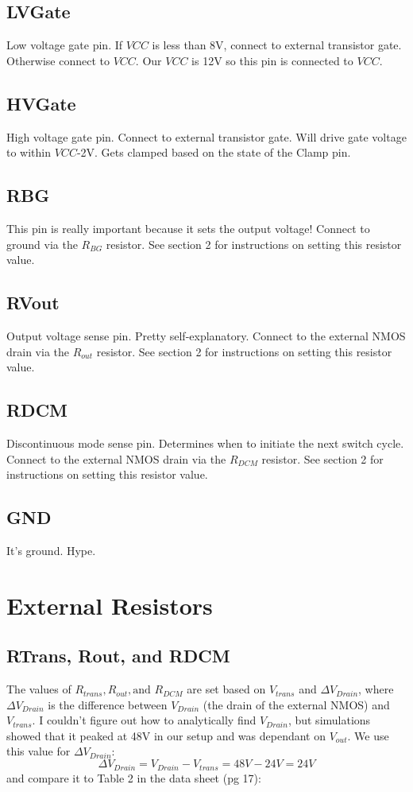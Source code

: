\documentclass{article}
\begin{document}
	\subsection{LVGate}
	Low voltage gate pin. If $VCC$ is less than 8V, connect to external transistor gate. Otherwise connect to $VCC$. Our $VCC$ is 12V so this pin is connected to $VCC$. 
	
	\subsection{HVGate}
	High voltage gate pin. Connect to external transistor gate. Will drive gate voltage to within $VCC$-2V. Gets clamped based on the state of the Clamp pin.
	
	\subsection{RBG}
	This pin is really important because it sets the output voltage! Connect to ground via the $R_{BG}$ resistor. See section 2 for instructions on setting this resistor value.
	
	\subsection{RVout}
	Output voltage sense pin. Pretty self-explanatory. Connect to the external NMOS drain via the $R_{out}$ resistor. See section 2 for instructions on setting this resistor value.
	
	\subsection{RDCM}
	Discontinuous mode sense pin. Determines when to initiate the next switch cycle. Connect to the external NMOS drain via the $R_{DCM}$ resistor. See section 2 for instructions on setting this resistor value.
	
	\subsection{GND}
	It's ground. Hype.
	
	\section{External Resistors}
	\subsection{RTrans, Rout, and RDCM}
	The values of $R_{trans}, R_{out}, \text{and } R_{DCM}$ are set based on $V_{trans}$ and $\Delta V_{Drain}$, where $\Delta V_{Drain}$ is the difference between $V_{Drain}$ (the drain of the external NMOS) and $V_{trans}$. I couldn't figure out how to analytically find $V_{Drain}$, but simulations showed that it peaked at 48V in our setup and was dependant on $V_{out}$. We use this value for $\Delta V_{Drain}$:
	\[\Delta V_{Drain} = V_{Drain} - V_{trans} = 48V - 24V = 24V\]
	and compare it to Table 2 in the data sheet (pg 17):
	
\end{document}
